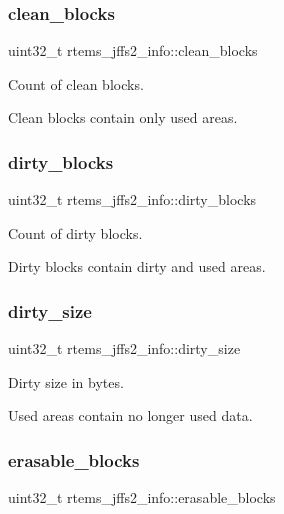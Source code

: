 \subsubsection{\texorpdfstring{clean\_blocks}{clean\_blocks}}
{\footnotesize\ttfamily uint32\+\_\+t rtems\+\_\+jffs2\+\_\+info\+::clean\+\_\+blocks}



Count of clean blocks. 

Clean blocks contain only used areas. \mbox{\label{structrtems__jffs2__info_a2ec0b2c878734a38faf7ed82c71acaa7}} 
\subsubsection{\texorpdfstring{dirty\_blocks}{dirty\_blocks}}
{\footnotesize\ttfamily uint32\+\_\+t rtems\+\_\+jffs2\+\_\+info\+::dirty\+\_\+blocks}



Count of dirty blocks. 

Dirty blocks contain dirty and used areas. \mbox{\label{structrtems__jffs2__info_ae569fd3b4994bec143f5b6acb2ed4d91}} 
\subsubsection{\texorpdfstring{dirty\_size}{dirty\_size}}
{\footnotesize\ttfamily uint32\+\_\+t rtems\+\_\+jffs2\+\_\+info\+::dirty\+\_\+size}



Dirty size in bytes. 

Used areas contain no longer used data. \mbox{\label{structrtems__jffs2__info_abd51db970ab442b56213b910da1fc7e8}} 
\subsubsection{\texorpdfstring{erasable\_blocks}{erasable\_blocks}}
{\footnotesize\ttfamily uint32\+\_\+t rtems\+\_\+jffs2\+\_\+info\+::erasable\+\_\+blocks}



